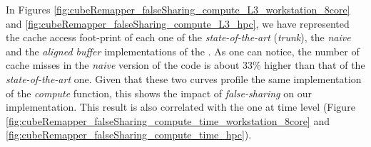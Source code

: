 		In Figures \ref{fig:cubeRemapper_falseSharing_compute_L3_workstation_8core} and \ref{fig:cubeRemapper_falseSharing_compute_L3_hpc}, we have represented the cache access foot-print of each one of the \emph{state-of-the-art} (\emph{trunk}), the \emph{naive} and the \emph{aligned buffer} implementations of the \toolTargetSoftware.   As one can notice, the number of cache misses in the \emph{naive} version of the code is about $33\%$ higher than that of the \emph{state-of-the-art} one.   Given that these two curves profile the same implementation of the \emph{compute} function, this shows the impact of \emph{false-sharing} on our implementation.   This result is also correlated with the one at time level (Figure \ref{fig:cubeRemapper_falseSharing_compute_time_workstation_8core} and \ref{fig:cubeRemapper_falseSharing_compute_time_hpc}).\\

